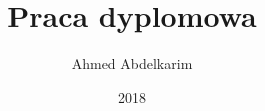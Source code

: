 \documentclass[pl]{minipw} %
\title{Praca dyplomowa} %
\author{Ahmed Abdelkarim}
\date{2018}
\begin{document}
\sloppy

\makestatement
\end{document}

